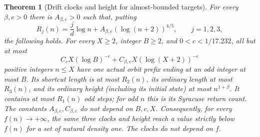 \documentclass[11pt]{article}
\newtheorem{theorem}[proposition]{Theorem}
\theoremstyle{remark}\newtheorem{remark}[proposition]{Remark}
\begin{document}
\begin{theorem}[Drift clocks and height for almost-bounded targets]
\label{thm:shaik-allikvere-drift-target}
For every \(\beta,e>0\) there is \(A_{\beta,e}>0\) such that,
putting
\[
 R_j(n)=\frac{j}{d}\log n+
             A_{\beta,e}(\log(n+2))^{4/5},\qquad j=1,2,3,
\]
the following holds. For every \(X\ge2\), integer \(B\ge2\), and
\(0<c<1/17.232\), all but at most
\begin{equation}\label{eq:shaik-allikvere-count}
 C_c X(\log B)^{-c}
       +C_{\beta,e}X(\log(X+2))^{-e}
\end{equation}
positive integers \(n\le X\) have one actual orbit prefix ending at
an odd integer at most \(B\). Its shortcut length is at most \(R_2(n)\),
its ordinary length at most \(R_3(n)\), and its ordinary height
(including its initial state) at most \(n^{1+\beta}\).
It contains at most \(R_1(n)\) odd steps; for odd \(n\) this is
its Syracuse return count.
The constants \(A_{\beta,e},C_{\beta,e}\) do not depend on \(B,c,X\).
Consequently, for every \(f(n)\to+\infty\), the same three clocks
and height reach a value strictly below \(f(n)\) for a set of
natural density one. The clocks do not depend on \(f\).
\end{theorem}
\end{document}
